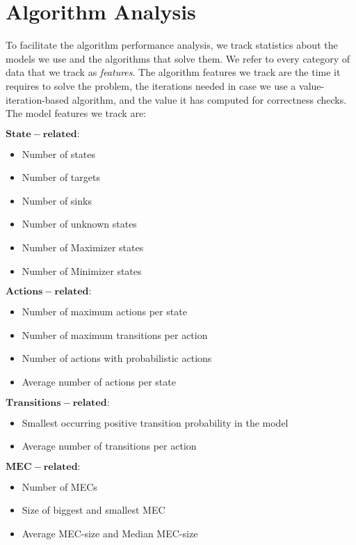 \chapter{Algorithm Analysis} \label{ch:analysis}

To facilitate the algorithm performance analysis, we track statistics about the models we use and the algorithms that solve them. 
We refer to every category of data that we track as \emph{features}.
The algorithm features we track are the time it requires to solve the problem, the iterations needed in case we use a value-iteration-based algorithm, 
and the value it has computed for correctness checks.
The model features we track are:

$\mathbf{State-related:}$
\begin{itemize}
\item Number of states
\item Number of targets
\item Number of sinks
\item Number of unknown states
\item Number of Maximizer states
\item Number of Minimizer states
\end{itemize}

$\mathbf{Actions-related:}$
\begin{itemize}
\item Number of maximum actions per state
\item Number of maximum transitions per action
\item Number of actions with probabilistic actions
\item Average number of actions per state
\end{itemize}

$\mathbf{Transitions-related:}$
\begin{itemize}
\item Smallest occurring positive transition probability in the model
\item Average number of transitions per action
\end{itemize} 

$\mathbf{MEC-related:}$
\begin{itemize}
\item Number of MECs
\item Size of biggest and smallest MEC
\item Average MEC-size and Median MEC-size
\end{itemize}

